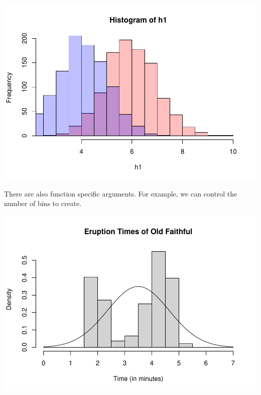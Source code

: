 \documentclass[
]{book}
\newenvironment{Shaded}{\begin{snugshade}}{\end{snugshade}}
\newcommand{\DataTypeTok}[1]{\textcolor[rgb]{0.13,0.29,0.53}{#1}}
\newcommand{\DecValTok}[1]{\textcolor[rgb]{0.00,0.00,0.81}{#1}}
\newcommand{\KeywordTok}[1]{\textcolor[rgb]{0.13,0.29,0.53}{\textbf{#1}}}
\newcommand{\NormalTok}[1]{#1}
\newcommand{\OperatorTok}[1]{\textcolor[rgb]{0.81,0.36,0.00}{\textbf{#1}}}
\newcommand{\StringTok}[1]{\textcolor[rgb]{0.31,0.60,0.02}{#1}}
\begin{document}
\begin{Shaded}
\end{Shaded}

\includegraphics{_main_files/figure-latex/unnamed-chunk-224-1.pdf}

There are also function specific arguments. For example, we can control the number of bins to create.

\begin{Shaded}
\end{Shaded}

\includegraphics{_main_files/figure-latex/unnamed-chunk-225-1.pdf}
\end{document}

